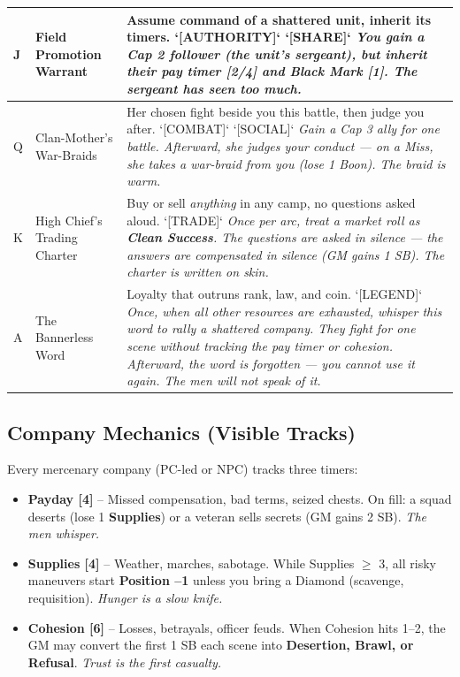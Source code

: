 \begin{longtable}{|p{}|p{}|p{}|}
\hline
J & Field Promotion Warrant & Assume command of a shattered unit, inherit its timers. `[AUTHORITY]` `[SHARE]` \textit{You gain a Cap 2 follower (the unit's sergeant), but inherit their pay timer [2/4] and \textbf{Black Mark [1]}. The sergeant has seen too much.} \\
\hline
Q & Clan-Mother's War-Braids & Her chosen fight beside you this battle, then judge you after. `[COMBAT]` `[SOCIAL]` \textit{Gain a Cap 3 ally for one battle. Afterward, she judges your conduct --- on a Miss, she takes a war-braid from you (lose 1 Boon). The braid is warm.} \\
\hline
K & High Chief's Trading Charter & Buy or sell \emph{anything} in any camp, no questions asked aloud. `[TRADE]` \textit{Once per arc, treat a market roll as \textbf{Clean Success}. The questions are asked in silence --- the answers are compensated in silence (GM gains 1 SB). The charter is written on skin.} \\
\hline
A & The Bannerless Word & Loyalty that outruns rank, law, and coin. `[LEGEND]` \textit{Once, when all other resources are exhausted, whisper this word to rally a shattered company. They fight for one scene without tracking the pay timer or cohesion. Afterward, the word is forgotten --- you cannot use it again. The men will not speak of it.} \\
\hline
\end{longtable}

\subsection*{Company Mechanics (Visible Tracks)}

Every mercenary company (PC-led or NPC) tracks three timers:

\begin{itemize}
    \item \textbf{Payday [4]} -- Missed compensation, bad terms, seized chests. On fill: a squad deserts (lose 1 \textbf{Supplies}) or a veteran sells secrets (GM gains 2 SB). \textit{The men whisper.}
    \item \textbf{Supplies [4]} -- Weather, marches, sabotage. While Supplies $\geq$ 3, all risky maneuvers start \textbf{Position --1} unless you bring a Diamond (scavenge, requisition). \textit{Hunger is a slow knife.}
    \item \textbf{Cohesion [6]} -- Losses, betrayals, officer feuds. When Cohesion hits 1--2, the GM may convert the first 1 SB each scene into \textbf{Desertion, Brawl, or Refusal}. \textit{Trust is the first casualty.}
\end{itemize}

